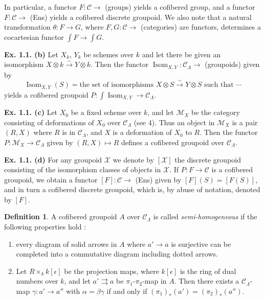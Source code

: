 \documentclass[11pt]{article}
\theoremstyle{plain}
\theoremstyle{definition}
\newtheorem{definition}[theorem]{Definition}
\theoremstyle{remark}
\DeclareMathOperator{\Isom}{Isom}
\providecommand{\S}{\mathcal{S}}
\begin{document}
In particular, a functor $F: \mathcal{C} \to$ (groups) yields a cofibered group, and a functor $F: \mathcal{C} \to$ (Ens) yields a cofibered discrete groupoid. We also note that a natural transformation $\theta: F \to G$, where $F, G: \mathcal{C} \to$ (categories) are functors, determines a cocartesian functor $\int F \to \int G$.

\textbf{Ex. 1.1. (b)} Let $X_k$, $Y_k$ be schemes over $k$ and let there be given an isomorphism $X \otimes k \xrightarrow{\sim} Y \otimes k$. Then the functor $\Isom_{X,Y}: \mathcal{C}_\Lambda \to$ (groupoids) given by
\[
\Isom_{X,Y}(S) = \text{the set of isomorphisms } X \otimes S \xrightarrow{\sim} Y \otimes S \text{ such that } \cdots
\]
yields a cofibered groupoid $P: \int\Isom_{X,Y} \to \mathcal{C}_\Lambda$.

\textbf{Ex. 1.1. (c)} Let $X_0$ be a fixed scheme over $k$, and let $\mathcal{M}_X$ be the category consisting of deformations of $X_0$ over $\mathcal{C}_\Lambda$ (see \S 4). Thus an object in $\mathcal{M}_X$ is a pair $(R, X)$ where $R$ is in $\mathcal{C}_\Lambda$, and $X$ is a deformation of $X_0$ to $R$. Then the functor $P: \mathcal{M}_X \to \mathcal{C}_\Lambda$ given by $(R, X) \mapsto R$ defines a cofibered groupoid over $\mathcal{C}_\Lambda$.

\textbf{Ex. 1.1. (d)} For any groupoid $\mathcal{X}$ we denote by $[\mathcal{X}]$ the discrete groupoid consisting of the isomorphism classes of objects in $\mathcal{X}$. If $P: F \to \mathcal{C}$ is a cofibered groupoid, we obtain a functor $[F]: \mathcal{C} \to$ (Ens) given by $[F](S) = [F(S)]$, and in turn a cofibered discrete groupoid, which is, by abuse of notation, denoted by $[F]$.

\begin{definition}
A cofibered groupoid $A$ over $\mathcal{C}_\Lambda$ is called \emph{semi-homogeneous} if the following properties hold :
\begin{enumerate}[label=(\arabic*)]
\item every diagram of solid arrows in $A$ where $a' \to a$ is surjective can be completed into a commutative diagram including dotted arrows.
\item Let $R \times_k k[\epsilon]$ be the projection maps, where $k[\epsilon]$ is the ring of dual numbers over $k$, and let $a' \rightrightarrows a$ be $\pi_1$-$\pi_2$-map in $A$. Then there exists a $\mathcal{C}_\Lambda$-map $\gamma: a' \to a''$ with $\alpha = \beta\gamma$ if and only if $(\pi_1)_*(a') = (\pi_2)_*(a'')$.
\end{enumerate}
\end{definition}
\end{document}
